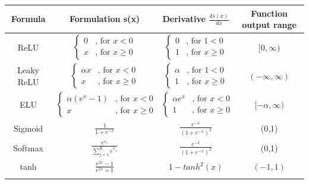\begin{tabular}{ c c c c }
\hline 
Formula & Formulation s(x) & Derivative $\frac{ds(x)}{dx}$ & Function output range \\ \hline                        
ReLU &   $\begin{cases} 0 & \text{, for }x < 0\\
	x & \text{, for }x \geqslant 0 \end{cases}$ & $\begin{cases} 0 & \text{, for }1 < 0\\
	1 & \text{, for }x \geqslant 0 \end{cases}$ & $[ 0, \infty)$\\

\rule{0pt}{5ex}%

Leaky ReLU &   $\begin{cases} \alpha x & \text{, for }x < 0\\
	x & \text{, for }x \geqslant 0 \end{cases}$ & $\begin{cases} \alpha & \text{, for }1 < 0\\
	1 & \text{, for }x \geqslant 0 \end{cases}$ & $(- \infty, \infty)$\\

\rule{0pt}{5ex}%

ELU &   $\begin{cases} \alpha(e^{x} - 1) & \text{, for }x < 0\\
	x & \text{, for }x \geqslant 0 \end{cases}$ & $\begin{cases} \alpha e^{x} & \text{, for }x < 0\\
	1 & \text{, for }x \geqslant 0 \end{cases}$ & $[ -\alpha, \infty)$\\
	
\rule{0pt}{5ex}%
	
Sigmoid & $\frac{1}{1+e^{-x}}$ & $\frac{e^{-x}}{(1+e^{-x})^{2}}$ & (0,1)\\

\rule{0pt}{5ex}%

Softmax & $\frac{e^{x_{i}}}{\sum_{j=1}^{K} e^{x_{j}}}$ & $\frac{e^{-x}}{(1+e^{-x})^{2}}$ & (0,1)\\

\rule{0pt}{5ex}%

tanh & $\frac{e^{2x}-1}{e^{2x}+1}$ & $1-tanh^{2}(x)$ & $(-1,1)$ \\
\hline  
\label{tab:activation_functions}

\end{tabular}

